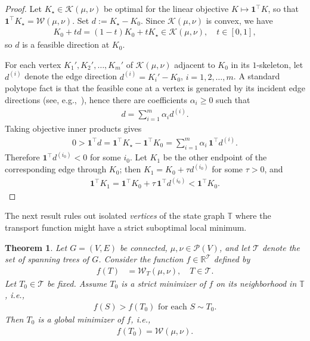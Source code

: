 \documentclass[10pt,a4paper]{amsart}
\newcommand{\prob}{{\mathscr{P}}}
\newcommand{\wass}{{\mathcal{W}}}
\newcommand{\setoftrees}{{\mathcal{T}}}
\newcommand{\stategraph}{{\mathbb{T}}}
\newcommand{\flowpoly}{{\mathcal{K}}}
\newtheorem{theorem}{Theorem}[section]
\begin{document}
\begin{proof}
    Let $K_\star\in\flowpoly(\mu,\nu)$ be optimal for the linear objective $K\mapsto \mathbf{1}^\top K$, so that $\mathbf{1}^\top K_\star = \wass(\mu,\nu)$. Set $d:=K_\star-K_0$. Since $\flowpoly(\mu,\nu)$ is convex, we have
        \begin{align*}
            K_0+t d = (1-t)K_0+tK_\star \in \flowpoly(\mu,\nu),\quad t\in[0,1],
        \end{align*}
    so $d$ is a feasible direction at $K_0$.

    For each vertex $K_1',K_2',\dotsc, K_m'$ of $\flowpoly(\mu,\nu)$ adjacent to $K_0$ in its $1$-skeleton, let $d^{(i)}$ denote the edge direction $d^{(i)} = K_{i}'-K_0$, $i=1,2,\dotsc, m$. A standard polytope fact is that the feasible cone at a vertex is generated by its incident edge directions (see, e.g.,~\cite{ziegler1995lectures}), hence there are coefficients $\alpha_i\ge 0$ such that
        \begin{align*}
            d = \sum_{i=1}^m \alpha_i d^{(i)}.
        \end{align*}
    Taking objective inner products gives
        \begin{align*}
            0 > \mathbf{1}^\top d = \mathbf{1}^\top K_\star - \mathbf{1}^\top K_0 = \sum_{i=1}^m \alpha_i\,\mathbf{1}^\top d^{(i)}.
        \end{align*}
    Therefore $\mathbf{1}^\top d^{(i_0)}<0$ for some $i_0$. Let $K_1$ be the other endpoint of the corresponding edge through $K_0$; then $K_1 = K_0 + \tau d^{(i_0)}$ for some $\tau>0$, and
        \begin{align*}
            \mathbf{1}^\top K_1 = \mathbf{1}^\top K_0 + \tau\,\mathbf{1}^\top d^{(i_0)} < \mathbf{1}^\top K_0.
        \end{align*}
\end{proof}

The next result rules out isolated \emph{vertices} of the state graph $\stategraph$ where the transport function might have a strict suboptimal local minimum.

\begin{theorem}\label{thm:isolated-vertex-minimizers}
    Let $G=(V,E)$ be connected, $\mu,\nu\in\prob(V)$, and let $\setoftrees$ denote the set of spanning trees of $G$. Consider the function $f\in\mathbb{R}^{\setoftrees}$ defined by
        \begin{align*}
            f(T) &= \wass_T(\mu,\nu), \quad T\in\setoftrees.
        \end{align*}
    Let $T_0\in\setoftrees$ be fixed. Assume $T_0$ is a strict minimizer of $f$ on its neighborhood in $\stategraph$, i.e.,
        \begin{align}\label{eq:strict-local-min}
            f(S) > f(T_0)\text{ for each }S\sim T_0.
        \end{align}
    Then $T_0$ is a global minimizer of $f$, i.e.,
        \begin{align*}
            f(T_0) = \wass(\mu,\nu).
        \end{align*}
\end{theorem}
\end{document}
